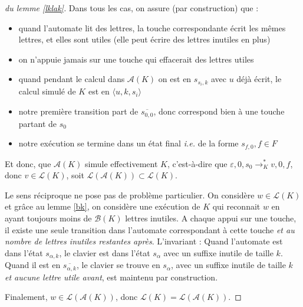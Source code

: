 \documentclass[12pt, a4paper]{article}
\renewcommand{\L}{\mathcal{L}}
\newcommand{\A}{\mathcal{A}}
\begin{document}
\begin{proof}[du lemme \ref{lklak}]
       Dans tous les cas, on assure (par construction) que :
       \begin{itemize}
        \item quand l'automate lit des lettres, la touche correspondante écrit les mêmes lettres, et elles sont utiles (elle peut écrire des lettres inutiles en plus)
        \item on n'appuie jamais sur une touche qui effacerait des lettres utiles 
        \item quand pendant le calcul dans $\A(K)$ on est en $s_{s_i,k}$ avec $u$ déjà écrit, le calcul simulé de $K$ est en $\langle u,k,s_i\rangle$
        \item notre première transition part de $\overline{s_{0,0}}$, donc correspond bien à une touche partant de $s_0$ 
        \item notre exécution se termine dans un état final \textit{i.e.} de la forme $s_{f,0}, f \in F$
       \end{itemize} 
       Et donc, que $\A(K)$ simule effectivement $K$, c'est-à-dire que $\varepsilon,0,s_0 \rightarrow^*_K v,0,f$, donc $v \in \L(K)$, soit $\L(\A(K)) \subset \L(K)$.

       Le sens réciproque ne pose pas de problème particulier. On considère $w \in \L(K)$ et grâce au lemme \ref{bk}, on considère une exécution de $K$ qui reconnait $w$ en ayant toujours moins de $\mathcal{B}(K)$ lettres inutiles.
       A chaque appui sur une touche, il existe une seule transition dans l'automate correspondant à cette touche \emph{et au nombre de lettres inutiles restantes après}. L'invariant : Quand l'automate est dans l'état $s_{\alpha,k}$, le clavier est dans l'état $s_\alpha$ avec un suffixe inutile de taille $k$. Quand il est en $\overline{s_{\alpha,k}}$, le clavier se trouve en $s_\alpha$, avec un suffixe inutile de taille $k$ \emph{et aucune lettre utile avant}, est maintenu par construction.
    
       Finalement, $w \in \L(\A(K))$, donc $\L(K) = \L(\A(K))$.
    \end{proof}
\end{document}
